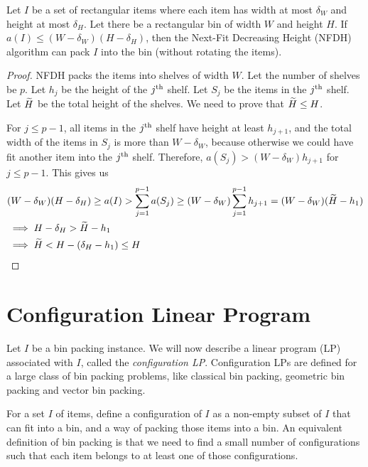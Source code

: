 \begin{lemma}
\label{thm:nfdh-small}
Let $I$ be a set of rectangular items where each item has width at most $\delta_W$
and height at most $\delta_H$. Let there be a rectangular bin of width $W$ and height $H$.
If $a(I) \le (W - \delta_W)(H - \delta_H)$, then the Next-Fit Decreasing Height (NFDH)
algorithm can pack $I$ into the bin (without rotating the items).
\end{lemma}
\begin{proof}
NFDH packs the items into shelves of width $W$.
Let the number of shelves be $p$.
Let $h_j$ be the height of the $j^{\textrm{th}}$ shelf.
Let $S_j$ be the items in the $j^{\textrm{th}}$ shelf.
Let $\widetilde{H}$ be the total height of the shelves.
We need to prove that $\widetilde{H} \le H$.

For $j \le p-1$, all items in the $j^{\textrm{th}}$ shelf have height at least $h_{j+1}$,
and the total width of the items in $S_j$ is more than $W-\delta_W$,
because otherwise we could have fit another item into the $j^{\textrm{th}}$ shelf.
Therefore, $a(S_j) > (W-\delta_W)h_{j+1}$ for $j \le p-1$. This gives us
\begin{align*}
& (W - \delta_W)(H - \delta_H) \ge a(I) > \sum_{j=1}^{p-1} a(S_j)
\ge (W-\delta_W)\sum_{j=1}^{p-1} h_{j+1}
= (W-\delta_W)(\widetilde{H} - h_1)
\\ &\implies H - \delta_H > \widetilde{H} - h_1
\\ &\implies \widetilde{H} < H - (\delta_H - h_1) \le H
\qedhere \end{align*}
\end{proof}

\section{Configuration Linear Program}
\label{sec:config-lp}

Let $I$ be a bin packing instance.
We will now describe a linear program (LP) associated with $I$,
called the \emph{configuration LP}.
Configuration LPs are defined for a large class of bin packing problems,
like classical bin packing, geometric bin packing and vector bin packing.

For a set $I$ of items, define a configuration of $I$ as a non-empty subset of $I$
that can fit into a bin, and a way of packing those items into a bin.
An equivalent definition of bin packing is that we need to find
a small number of configurations such that each item belongs to
at least one of those configurations.

